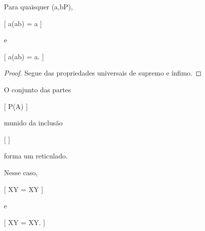 \documentclass[../../main]{subfiles}
\begin{document}
\begin{prop}

	Para quaisquer (a,b\in P),

	[
			a\vee(a\wedge b)
			=
			a
		]

	e

		[
			a\wedge(a\vee b)
			=
			a.
		]

\end{prop}

\begin{proof}

	Segue das propriedades universais de supremo e ínfimo.

\end{proof}

\begin{ex}

	O conjunto das partes

		[
			\mathcal P(A)
		]

	munido da inclusão

	[
	\subseteq
	]

	forma um reticulado.

	Nesse caso,

	[
			X\vee Y
			=
			X\cup Y
		]

	e

		[
			X\wedge Y
			=
			X\cap Y.
		]

\end{ex}
\end{document}
